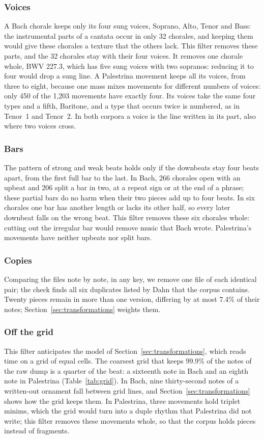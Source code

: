 \subsubsection{Voices}
A Bach chorale keeps only its four sung voices, Soprano, Alto, Tenor and Bass: the instrumental parts of a cantata occur in only 32 chorales, and keeping them would give these chorales a texture that the others lack. This filter removes these parts, and the 32 chorales stay with their four voices. It removes one chorale whole, BWV 227.3, which has five sung voices with two sopranos: reducing it to four would drop a sung line. A Palestrina movement keeps all its voices, from three to eight, because one mass mixes movements for different numbers of voices: only 450 of the 1,203 movements have exactly four. Its voices take the same four types and a fifth, Baritone, and a type that occurs twice is numbered, as in Tenor~1 and Tenor~2. In both corpora a voice is the line written in its part, also where two voices cross.

\subsubsection{Bars}
The pattern of strong and weak beats holds only if the downbeats stay four beats apart, from the first full bar to the last. In Bach, 266 chorales open with an upbeat and 206 split a bar in two, at a repeat sign or at the end of a phrase; these partial bars do no harm when their two pieces add up to four beats. In six chorales one bar has another length or lacks its other half, so every later downbeat falls on the wrong beat. This filter removes these six chorales whole: cutting out the irregular bar would remove music that Bach wrote. Palestrina's movements have neither upbeats nor split bars.

\subsubsection{Copies}
Comparing the files note by note, in any key, we remove one file of each identical pair; the check finds all six duplicates listed by Dahn \cite{dahn2018} that the corpus contains. Twenty pieces remain in more than one version, differing by at most 7.4\% of their notes; Section~\ref{sec:transformations} weights them.

\subsubsection{Off the grid}
This filter anticipates the model of Section~\ref{sec:transformations}, which reads time on a grid of equal cells. The coarsest grid that keeps 99.9\% of the notes of the raw dump is a quarter of the beat: a sixteenth note in Bach and an eighth note in Palestrina (Table~\ref{tab:grid}). In Bach, nine thirty-second notes of a written-out ornament fall between grid lines, and Section~\ref{sec:transformations} shows how the grid keeps them. In Palestrina, three movements hold triplet minims, which the grid would turn into a duple rhythm that Palestrina did not write; this filter removes these movements whole, so that the corpus holds pieces instead of fragments.

